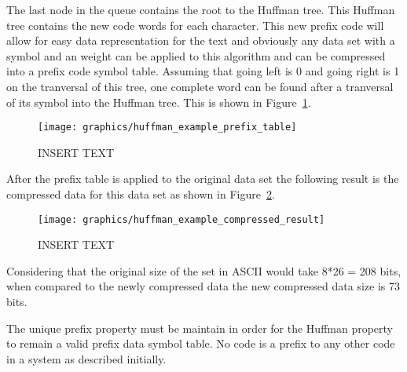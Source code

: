 \documentclass[letterpaper, 12pt]{article}
\begin{document}
The last node in the queue contains the root to the Huffman tree. This Huffman tree
contains the new code words for each character. This new prefix code will allow for easy
data representation for the text and obviously any data set with a symbol and an weight can
be applied to this algorithm and can be compressed into a prefix code symbol table.
Assuming that going left is 0 and going right is 1 on the tranversal of this tree, one complete
word can be found after a tranversal of its symbol into the Huffman tree. This is shown in
Figure~\ref{fig:huffman_prefix_table}.
\par\vspace{\baselineskip}

\begin{figure}
  \centering
  \texttt{[image: graphics/huffman\_example\_prefix\_table]}
  \caption{INSERT TEXT}
  \label{fig:huffman_prefix_table}
\end{figure}

\par\vspace{\baselineskip}
After the prefix table is applied to the original data set the following result is the compressed
data for this data set as shown in Figure~\ref{fig:huffman_compressed}.
\par\vspace{\baselineskip}
\begin{figure}
  \centering
  \texttt{[image: graphics/huffman\_example\_compressed\_result]}
  \caption{INSERT TEXT}
  \label{fig:huffman_compressed}
\end{figure}

Considering that the original size of the set in ASCII would take 8*26 = 208 bits, when compared to
the newly compressed data the new compressed data size is 73 bits.
\par\vspace{\baselineskip}
The unique prefix property must be maintain in order for the Huffman property to remain a valid prefix
data symbol table. No code is a prefix to any other code in a system as described initially.
\par\vspace{\baselineskip}
\end{document}

